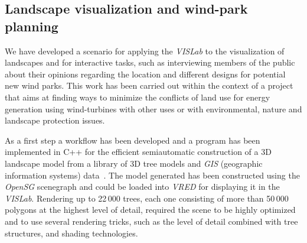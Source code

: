 \documentclass[twocolumn]{svjour3}          %
\begin{document}

\subsection{Landscape visualization and wind-park planning}
\label{windpark-planning}

We have developed a scenario for applying the \emph{VISLab} to the visualization of landscapes and for interactive tasks, such as interviewing members of the public about their opinions regarding the location and different designs for potential new wind parks. This work has been carried out within the context of a project that aims at finding ways to minimize the conflicts of land use for energy generation using wind-turbines with other uses or with environmental, nature and landscape protection issues.

As a first step a workflow has been developed and a program has been implemented in C++ for the efficient semiautomatic construction of a 3D landscape model from a library of 3D tree models and \emph{GIS} (geographic information systems) data~\cite{zehner:landscape}. The model generated has been constructed using the \emph{OpenSG} scenegraph and could be loaded into \emph{VRED} for displaying it in the \emph{VISLab}. Rendering up to 22\,000 trees, each one consisting of more than 50\,000 polygons at the highest level of detail, required the scene to be highly optimized and to use several rendering tricks, such as the level of detail combined with tree structures, and shading technologies.
\end{document}
